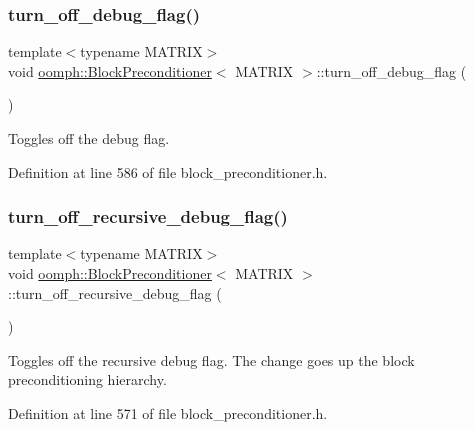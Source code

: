 \subsubsection{\texorpdfstring{turn\+\_\+off\+\_\+debug\+\_\+flag()}{turn\_off\_debug\_flag()}}
{\footnotesize\ttfamily template$<$typename M\+A\+T\+R\+IX$>$ \\
void \hyperlink{classoomph_1_1BlockPreconditioner}{oomph\+::\+Block\+Preconditioner}$<$ M\+A\+T\+R\+IX $>$\+::turn\+\_\+off\+\_\+debug\+\_\+flag (\begin{DoxyParamCaption}{ }\end{DoxyParamCaption})\hspace{0.3cm}{\ttfamily [inline]}}



Toggles off the debug flag. 



Definition at line 586 of file block\+\_\+preconditioner.\+h.

\mbox{\label{classoomph_1_1BlockPreconditioner_a8ed741a5fbf514fc29f0a332a211255f}} 
\subsubsection{\texorpdfstring{turn\+\_\+off\+\_\+recursive\+\_\+debug\+\_\+flag()}{turn\_off\_recursive\_debug\_flag()}}
{\footnotesize\ttfamily template$<$typename M\+A\+T\+R\+IX$>$ \\
void \hyperlink{classoomph_1_1BlockPreconditioner}{oomph\+::\+Block\+Preconditioner}$<$ M\+A\+T\+R\+IX $>$\+::turn\+\_\+off\+\_\+recursive\+\_\+debug\+\_\+flag (\begin{DoxyParamCaption}{ }\end{DoxyParamCaption})\hspace{0.3cm}{\ttfamily [inline]}}



Toggles off the recursive debug flag. The change goes up the block preconditioning hierarchy. 



Definition at line 571 of file block\+\_\+preconditioner.\+h.

